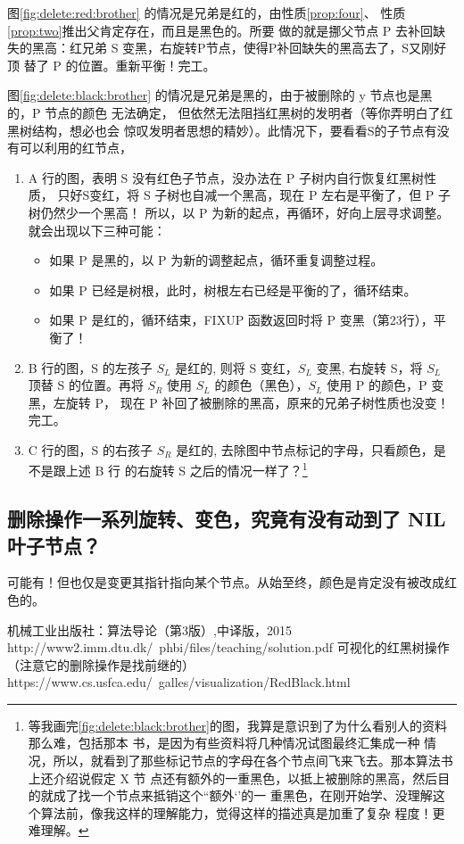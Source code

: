 \documentclass[a4paper, 11pt]{article}
\begin{document}
图\ref{fig:delete:red:brother} 的情况是兄弟是红的，由性质\ref{prop:four}、
性质\ref{prop:two}推出父肯定存在，而且是黑色的。所要
做的就是挪父节点 P 去补回缺失的黑高：红兄弟 S 变黑，右旋转P节点，使得P补回缺失的黑高去了，S又刚好顶
替了 P 的位置。重新平衡！完工。

图\ref{fig:delete:black:brother} 的情况是兄弟是黑的，由于被删除的 y 节点也是黑的，P 节点的颜色
无法确定，
但依然无法阻挡红黑树的发明者（等你弄明白了红黑树结构，想必也会
惊叹发明者思想的精妙）。此情况下，要看看S的子节点有没有可以利用的红节点，

\begin{enumerate}
\item A 行的图，表明 S 没有红色子节点，没办法在 P 子树内自行恢复红黑树性质，
只好S变红，将 S 子树也自减一个黑高，现在 P 左右是平衡了，但 P 子树仍然少一个黑高！
所以，以 P 为新的起点，再循环，好向上层寻求调整。就会出现以下三种可能：

\begin{itemize}
\item 如果 P 是黑的，以 P 为新的调整起点，循环重复调整过程。
\item 如果 P 已经是树根，此时，树根左右已经是平衡的了，循环结束。
\item 如果 P 是红的，循环结束，FIXUP 函数返回时将 P 变黑（第23行），平衡了！
\end{itemize}

\item B 行的图，S 的左孩子 $S_L$ 是红的, 则将 S 变红，$S_L$ 变黑, 右旋转 S，将 $S_L$ 顶替
S 的位置。再将 $S_R$ 使用 $S_L$ 的颜色（黑色），$S_L$ 使用 P 的颜色，P 变黑，左旋转 P，
现在 P 补回了被删除的黑高，原来的兄弟子树性质也没变！完工。

\item C 行的图，S 的右孩子 $S_R$ 是红的, 去除图中节点标记的字母，只看颜色，是不是跟上述 B 行
的右旋转 S 之后的情况一样了？\footnote{
等我画完\ref{fig:delete:black:brother}的图，我算是意识到了为什么看别人的资料那么难，包括那本
书，是因为有些资料将几种情况试图最终汇集成一种
情况，所以，就看到了那些标记节点的字母在各个节点间飞来飞去。那本算法书上还介绍说假定 X 节
点还有额外的一重黑色，以抵上被删除的黑高，然后目的就成了找一个节点来抵销这个``额外‘’的一
重黑色，在刚开始学、没理解这个算法前，像我这样的理解能力，觉得这样的描述真是加重了复杂
程度！更难理解。}

\end{enumerate}


\subsection{删除操作一系列旋转、变色，究竟有没有动到了 NIL 叶子节点？}
可能有！但也仅是变更其指针指向某个节点。从始至终，颜色是肯定没有被改成红色的。

\newpage
\begin{thebibliography}{99}
机械工业出版社：算法导论（第3版）,中译版，2015
http://www2.imm.dtu.dk/~phbi/files/teaching/solution.pdf
可视化的红黑树操作（注意它的删除操作是找前继的）https://www.cs.usfca.edu/~galles/visualization/RedBlack.html
 
\end{thebibliography}
\end{document}
